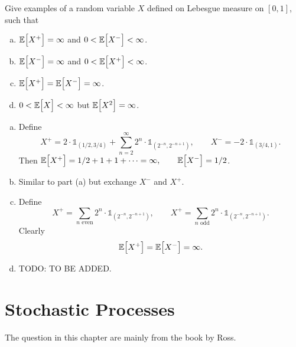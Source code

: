 \begin{problem}
	Give examples of a random variable $ X $ defined on Lebesgue measure on $ [0,1] $, such that 
	\begin{enumerate}[(a)]
		\item $ \mathbb{E}\big[X^+\big] = \infty $ and $ 0 < \mathbb{E}\big[X^-\big] < \infty $.
		\item $ \mathbb{E}\big[X^-\big] = \infty $ and $ 0 < \mathbb{E}\big[X^+\big] < \infty $.
		\item $ \mathbb{E}\big[X^+\big] = \mathbb{E}\big[X^-\big] = \infty $.
		\item $ 0 < \mathbb{E}\big[X\big] < \infty $ but $ \mathbb{E}\big[X^2\big] = \infty $.
	\end{enumerate}
\end{problem}
\begin{solution}
	\begin{enumerate}[(a)]
		\item Define 
		\[ X^+ = 2\cdot \mathds{1}_{(1/2,3/4)} + \sum_{n=2}^\infty 2^n \cdot \mathds{1}_{(2^{-n}, 2^{-n+1})}, 
		\qquad 
		X^- = -2 \cdot \mathds{1}_{(3/4,1)}. \]
		Then $ \mathbb{E}\big[X^+\big] = 1/2 + 1 + 1 + \cdots = \infty, \qquad \mathbb{E}\big[X^-\big] = 1/2 $.
		
		\item Similar to part (a) but exchange $ X^- $ and $ X^+ $.
		
		\item Define
		\[ X^+ = \sum_{n\text{ even}} 2^n \cdot \mathds{1}_{(2^{-n}, 2^{-n+1})}, 
		\qquad 
		X^+ = \sum_{n\text{ odd}} 2^n \cdot \mathds{1}_{(2^{-n}, 2^{-n+1})}. \]
		Clearly
		\[ \mathbb{E}\big[X^+\big] = \mathbb{E}\big[X^-\big] = \infty. \]
		
		\item {\color{red} \noindent TODO: TO BE ADDED.}
	\end{enumerate}
\end{solution}


\newpage
\chapter{Stochastic Processes}
The question in this chapter are mainly from the book by Ross.

